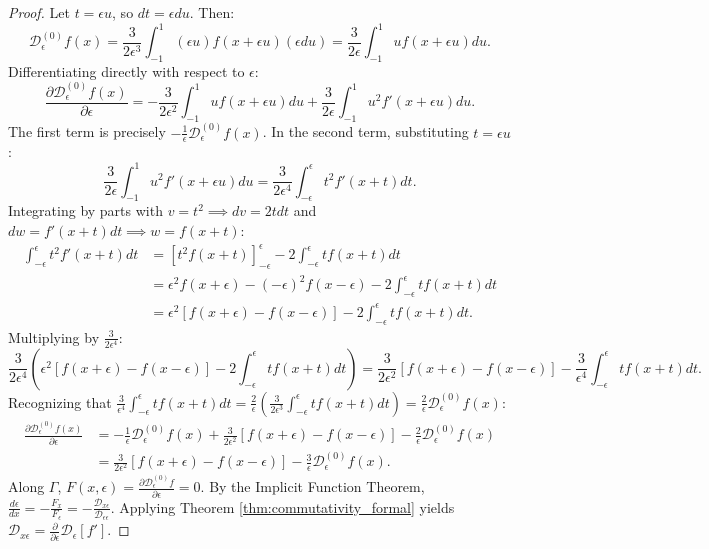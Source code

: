 \documentclass[11pt,a4paper]{article}
\theoremstyle{definition}
\begin{document}
\begin{proof}
Let $t = \epsilon u$, so $dt = \epsilon du$. Then:
\begin{equation}
\mathcal{D}_\epsilon^{(0)} f(x) = \frac{3}{2\epsilon^3} \int_{-1}^1 (\epsilon u) f(x + \epsilon u) (\epsilon du) = \frac{3}{2\epsilon} \int_{-1}^1 u f(x + \epsilon u) du.
\end{equation}
Differentiating directly with respect to $\epsilon$:
\begin{equation}
\frac{\partial \mathcal{D}_\epsilon^{(0)} f(x)}{\partial \epsilon} = -\frac{3}{2\epsilon^2} \int_{-1}^1 u f(x + \epsilon u) du + \frac{3}{2\epsilon} \int_{-1}^1 u^2 f'(x + \epsilon u) du.
\end{equation}
The first term is precisely $-\frac{1}{\epsilon} \mathcal{D}_\epsilon^{(0)} f(x)$. In the second term, substituting $t = \epsilon u$:
\begin{equation}
\frac{3}{2\epsilon} \int_{-1}^1 u^2 f'(x + \epsilon u) du = \frac{3}{2\epsilon^4} \int_{-\epsilon}^\epsilon t^2 f'(x + t) dt.
\end{equation}
Integrating by parts with $v = t^2 \implies dv = 2t dt$ and $dw = f'(x+t)dt \implies w = f(x+t)$:
\begin{align}
\int_{-\epsilon}^\epsilon t^2 f'(x + t) dt &= \left[ t^2 f(x + t) \right]_{-\epsilon}^\epsilon - 2 \int_{-\epsilon}^\epsilon t f(x + t) dt \nonumber \\
&= \epsilon^2 f(x + \epsilon) - (-\epsilon)^2 f(x - \epsilon) - 2 \int_{-\epsilon}^\epsilon t f(x + t) dt \nonumber \\
&= \epsilon^2 [f(x + \epsilon) - f(x - \epsilon)] - 2 \int_{-\epsilon}^\epsilon t f(x + t) dt.
\end{align}
Multiplying by $\frac{3}{2\epsilon^4}$:
\begin{equation}
\frac{3}{2\epsilon^4} \left( \epsilon^2 [f(x+\epsilon) - f(x-\epsilon)] - 2 \int_{-\epsilon}^\epsilon t f(x+t) dt \right) = \frac{3}{2\epsilon^2}[f(x+\epsilon) - f(x-\epsilon)] - \frac{3}{\epsilon^4} \int_{-\epsilon}^\epsilon t f(x+t) dt.
\end{equation}
Recognizing that $\frac{3}{\epsilon^4} \int_{-\epsilon}^\epsilon t f(x+t) dt = \frac{2}{\epsilon}\left(\frac{3}{2\epsilon^3}\int_{-\epsilon}^\epsilon t f(x+t) dt\right) = \frac{2}{\epsilon}\mathcal{D}_\epsilon^{(0)}f(x)$:
\begin{align}
\frac{\partial \mathcal{D}_\epsilon^{(0)} f(x)}{\partial \epsilon} &= -\frac{1}{\epsilon}\mathcal{D}_\epsilon^{(0)}f(x) + \frac{3}{2\epsilon^2}[f(x+\epsilon) - f(x-\epsilon)] - \frac{2}{\epsilon}\mathcal{D}_\epsilon^{(0)}f(x) \nonumber \\
&= \frac{3}{2\epsilon^2}[f(x+\epsilon) - f(x-\epsilon)] - \frac{3}{\epsilon}\mathcal{D}_\epsilon^{(0)}f(x).
\end{align}
Along $\Gamma$, $F(x, \epsilon) = \frac{\partial \mathcal{D}_\epsilon^{(0)} f}{\partial \epsilon} = 0$. By the Implicit Function Theorem, $\frac{d\epsilon}{dx} = -\frac{F_x}{F_\epsilon} = -\frac{\mathcal{D}_{x\epsilon}}{\mathcal{D}_{\epsilon\epsilon}}$. Applying Theorem \ref{thm:commutativity_formal} yields $\mathcal{D}_{x\epsilon} = \frac{\partial}{\partial \epsilon}\mathcal{D}_\epsilon[f']$.
\end{proof}
\end{document}
